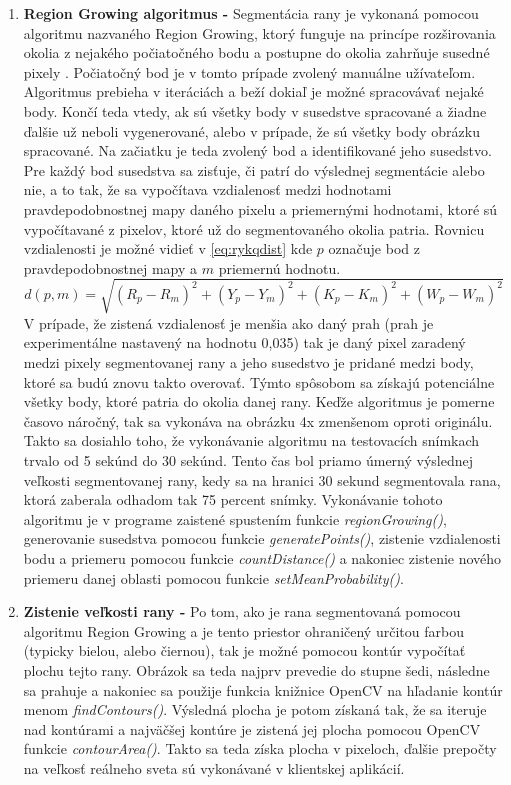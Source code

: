 \begin{enumerate}
    \item \textbf{Region Growing algoritmus -} Segmentácia rany je vykonaná pomocou algoritmu nazvaného Region Growing, ktorý funguje na princípe rozširovania okolia z nejakého počiatočného bodu a postupne do okolia zahrňuje susedné pixely \cite{AHMADFAUZI201574}. Počiatočný bod je v tomto prípade zvolený manuálne užívateľom. Algoritmus prebieha v iteráciách a beží dokiaľ je možné spracovávať nejaké body. Končí teda vtedy, ak sú všetky body v susedstve spracované a žiadne ďalšie už neboli vygenerované, alebo v prípade, že sú všetky body obrázku spracované. Na začiatku je teda zvolený bod a identifikované jeho susedstvo. Pre každý bod susedstva sa zisťuje, či patrí do výslednej segmentácie alebo nie, a to tak, že sa vypočítava vzdialenosť medzi hodnotami pravdepodobnostnej mapy daného pixelu a priemernými hodnotami, ktoré sú vypočítavané z pixelov, ktoré už do segmentovaného okolia patria. Rovnicu vzdialenosti je možné vidieť v \ref{eq:rykqdist} kde $p$ označuje bod z pravdepodobnostnej mapy a $m$ priemernú hodnotu. 
    \begin{equation}
    \label{eq:rykqdist}
    d(p, m) = \sqrt{{(R_{p} - R_{m})}^2 + {(Y_{p} - Y_{m})}^2 + {(K_{p} - K_{m})}^2 + {(W_{p} - W_{m})}^2}
    \end{equation}
    V prípade, že zistená vzdialenosť je menšia ako daný prah (prah je experimentálne nastavený na hodnotu 0,035) tak je daný pixel zaradený medzi pixely segmentovanej rany a jeho susedstvo je pridané medzi body, ktoré sa budú znovu takto overovať. Týmto spôsobom sa získajú potenciálne všetky body, ktoré patria do okolia danej rany. Keďže algoritmus je pomerne časovo náročný, tak sa vykonáva na obrázku 4x zmenšenom oproti originálu. Takto sa dosiahlo toho, že vykonávanie algoritmu na testovacích snímkach trvalo od 5 sekúnd do 30 sekúnd. Tento čas bol priamo úmerný výslednej veľkosti segmentovanej rany, kedy sa na hranici 30 sekund segmentovala rana, ktorá zaberala odhadom tak 75 percent snímky. Vykonávanie tohoto algoritmu je v programe zaistené spustením funkcie \textit{regionGrowing()}, generovanie susedstva pomocou funkcie \textit{generatePoints()}, zistenie vzdialenosti bodu a priemeru pomocou funkcie \textit{countDistance()} a nakoniec zistenie nového priemeru danej oblasti pomocou funkcie \textit{setMeanProbability()}.
    
    \item \textbf{Zistenie veľkosti rany -} Po tom, ako je rana segmentovaná pomocou algoritmu Region Growing a  je tento priestor ohraničený určitou farbou (typicky bielou, alebo čiernou), tak je možné pomocou kontúr vypočítať plochu tejto rany. Obrázok sa teda najprv prevedie do stupne šedi, následne sa prahuje a nakoniec sa použije funkcia knižnice OpenCV na hľadanie kontúr menom \textit{findContours()}. Výsledná plocha je potom získaná tak, že sa iteruje nad kontúrami a najväčšej kontúre je zistená jej plocha pomocou OpenCV funkcie \textit{contourArea()}. Takto sa teda získa plocha v pixeloch, ďalšie prepočty na veľkosť reálneho sveta sú vykonávané v klientskej aplikácií. 
\end{enumerate}

